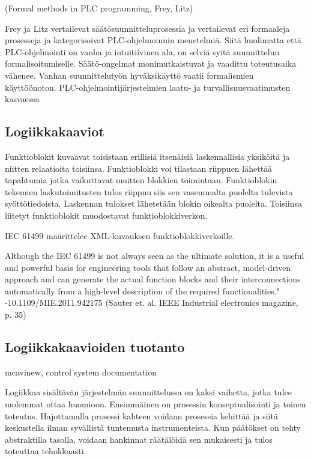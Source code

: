 \documentclass[finnish,12pt]{article}
\begin{document}
(Formal methods in PLC programming, Frey, Litz)

Frey ja Litz vertailevat säätösuunnitteluprosessia ja vertailevat eri formaaleja prosesseja ja kategorisoivat PLC-ohjelmoinnin menetelmiä. 
Siitä huolimatta että PLC-ohjelmointi on vanha ja intuitiivinen ala, on selviä syitä suunnittelun formalisoitumiselle.
Säätö-ongelmat monimutkaistuvat ja vaadittu toteutusaika vähenee.
Vanhan suunnittelutyön hyväksikäyttö vaatii formalismien käyttöönoton.
PLC-ohjelmointijärjestelmien laatu- ja turvallisuusvaatimusten kasvaessa 



		\subsection{Logiikkakaaviot}

Funktioblokit kuvaavat toisistaan erillisiä itsenäisiä laskennallisia yksiköitä ja niitten relaatioita toisiinsa.
Funktioblokki voi tilastaan riippuen lähettää tapahtumia jotka vaikuttavat muitten blokkien toimintaan.
Funktioblokin tekemien laskutoimitusten tulos riippuu siis sen vasemmalta puolelta tulevista syöttötiedoista.
Laskennan tulokset lähetetään blokin oikealta puolelta.
Toisiinsa liitetyt funktioblokit muodostavat funktioblokkiverkon. 

IEC 61499 määrittelee XML-kuvauksen funktioblokkiverkoille. 

Although the IEC 61499 is not always seen as the ultimate solution, it is a useful and powerful basis for engineering tools that follow an abstract, model-driven approach and can generate the actual function blocks and their interconnections automatically from a high-level description of the required functionalities." -10.1109/MIE.2011.942175 (Sauter et. al. IEEE Industrial electronics magazine, p. 35)


		\subsection{Logiikkakaavioiden tuotanto}
	
mcavinew, control system documentation

Logiikkaa sisältävän järjestelmän suunnittelussa on kaksi vaihetta, jotka tulee molemmat ottaa huomioon.
Ensimmäinen on prosessin konseptualisointi ja toinen toteutus.
Hajottamalla prosessi kahteen voidaan prosessia kehittää ja siitä keskustella ilman syvällistä tuntemusta instrumenteista.
Kun päätökset on tehty abstraktilla tasolla, voidaan hankinnat räätälöidä sen mukaisesti ja tulos toteuttaa tehokkaasti.
\end{document}
